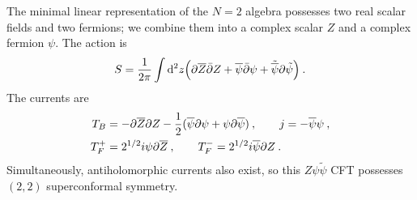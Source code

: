 The minimal linear representation of the $N=2$ algebra possesses two real scalar fields and two fermions; we combine them into a complex scalar $Z$ and a complex fermion $\psi$. The action is
\begin{equation}
	S=\frac{1}{2\pi} \int \mathrm{d}^{2}z\Bigl( \partial \overline{Z}\bar{\partial}Z 
	+\overline{\psi}\bar{\partial}\psi + \tilde{\overline{\psi}}\partial\tilde{\psi}\Bigr)\:. \label{11.1.5}
\end{equation}
The currents are
\begin{subequations}
	\begin{align}
		T_{B} &= -\partial \overline{Z}\partial Z -\frac{1}{2}(\overline{\psi}\partial\psi+\psi\partial\overline{\psi})\:,\qquad j=-\overline{\psi}\psi \:,\label{11.1.6a} \\
		T_{F}^{+} &= 2^{1/2} i\psi \partial\overline{Z} \:, \qquad 
		T_{F}^{-} = 2^{1/2} i\overline{\psi} \partial Z\:. \label{11.1.6b}
	\end{align} \label{11.1.6}
\end{subequations}
Simultaneously, antiholomorphic currents also exist, so this $Z\psi\tilde{\psi}$ CFT possesses $(2,2)$ superconformal symmetry.
